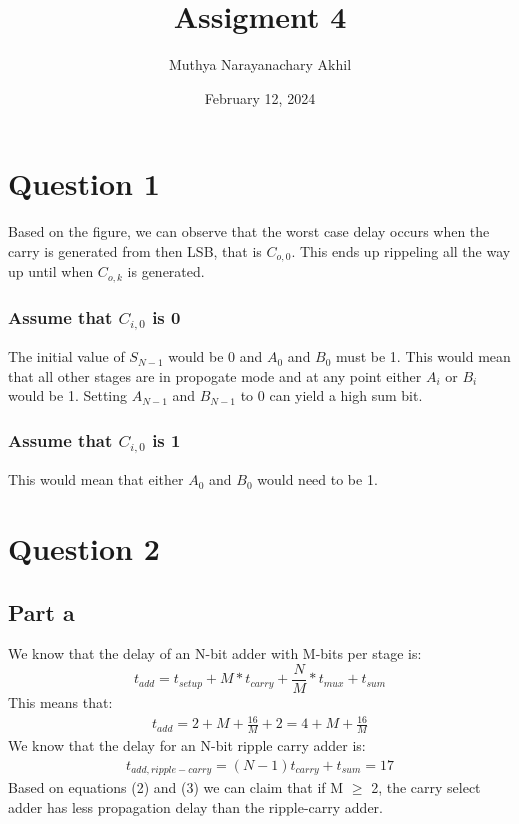 \documentclass{article}
\title{Assigment 4}
\author{Muthya Narayanachary Akhil}
\date{February 12, 2024}
\begin{document}
\maketitle
\section*{Question 1}
Based on the figure, we can observe that the worst case delay occurs
when the carry is generated from then LSB, that is $C_{o,0}$. This ends up rippeling all the way up until when $C_{o,k}$ is generated.

\subsubsection*{Assume that $C_{i,0}$ is 0}
The initial value of $S_{N-1}$ would be 0 and $A_{0}$ and $B_{0}$ must be 1.
This would mean that all other stages are in propogate mode and at any point either $A_{i}$ or $B_{i}$ would be 1.
Setting $A_{N-1}$ and $B_{N-1}$ to 0 can yield a high sum bit.

\subsubsection*{Assume that $C_{i,0}$ is 1}
This would mean that either $A_{0}$ and $B_{0}$ would need to be 1.

\section*{Question 2}
\subsection*{Part a}
We know that the delay of an N-bit adder with M-bits per stage is:
\begin{equation}
    t_{add} = t_{setup} + M*t_{carry} + \frac{N}{M} * t_{mux} + t_{sum}
\end{equation}
This means that:
\begin{eqnarray}
    t_{add} = 2 + M + \frac{16}{M} + 2 = 4 + M + \frac{16}{M}
\end{eqnarray}
We know that the delay for an N-bit ripple carry adder is:
\begin{eqnarray}
    t_{add,ripple-carry} = (N-1)t_{carry} + t_{sum} = 17
\end{eqnarray}
Based on equations (2) and (3) we can claim that if M $\geq$ 2, the carry select adder has less propagation delay than the ripple-carry adder.
\end{document}

